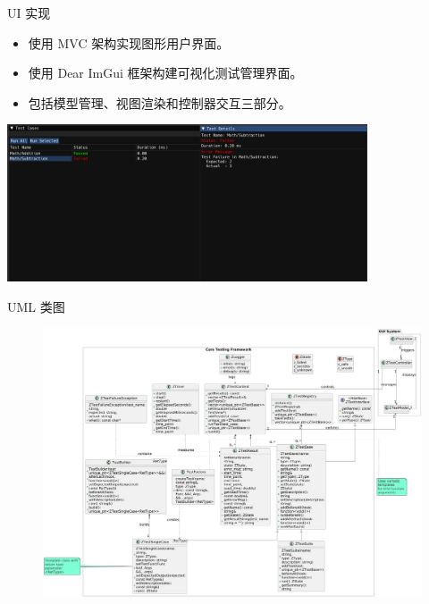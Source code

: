 \documentclass{beamer}
\begin{document}
\begin{frame}{UI 实现}
    \begin{itemize}
        \item 使用 MVC 架构实现图形用户界面。
        \item 使用 Dear ImGui 框架构建可视化测试管理界面。
        \item 包括模型管理、视图渲染和控制器交互三部分。
    \end{itemize}
    \centering
    \includegraphics[width=0.8\textwidth]{img/ui.png}
\end{frame}
\begin{frame}{UML 类图}
    \begin{figure}[H]
        \centering
        \includegraphics[width=\textwidth]{img/umlcore.png} %
        \label{fig:diagram}
    \end{figure}
\end{frame}
\end{document}
